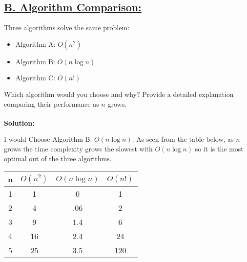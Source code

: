 \documentclass{article}
\begin{document}
\subsection*{\underline{B. Algorithm Comparison:}}
Three algorithms solve the same problem:
\begin{itemize}
    \item Algorithm A: \(O(n^2)\)
    \item Algorithm B: \(O(n\log n)\)
    \item Algorithm C: \(O(n!)\)
\end{itemize}
Which algorithm would you choose and why? Provide a detailed explanation comparing their performance as \(n\) grows.\\ \\
\textbf{Solution:}
\begin{myindentpar}{.5cm}
    I would Choose Algorithm B: \(O(n\log n)\). As seen from the table below, as \(n\) grows the time complexity grows the slowest with \(O(n\log n)\) so it is the most optimal out of the three algorithms. 
\end{myindentpar}
\begin{center}
    \begin{tabular}{|c||c|c|c|}
    \hline
    n&\(O(n^2)\)&\(O(n\log n)\) &\(O(n!)\) \\ [0,5ex]
    \hline
    1 & 1 & 0 & 1 \\
    2 & 4 & .06 & 2 \\
    3 & 9 & 1.4 & 6 \\ 
    4 & 16 & 2.4 & 24 \\
    5 & 25 & 3.5 & 120 \\
    \hline
    
    
    \end{tabular}
\end{center}
\pagebreak
\end{document}
